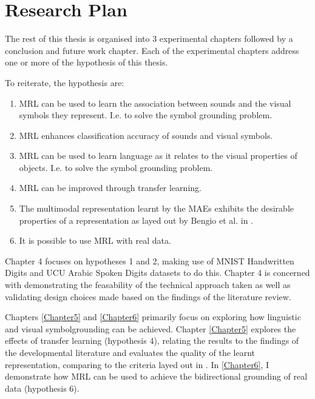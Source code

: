 \section{Research Plan}
The rest of this thesis is organised into 3 experimental chapters followed by a conclusion and future work chapter.
Each of the experimental chapters address one or more of the hypothesis of this thesis.

To reiterate, the hypothesis are:

\begin{enumerate}

	\item \ac{MRL} can be used to learn the association between sounds and the visual symbols they represent. I.e. to solve the symbol grounding problem.
	\item \ac{MRL} enhances classification accuracy of sounds and visual symbols.
	\item \ac{MRL} can be used to learn language as it relates to the visual properties of objects. I.e. to solve the symbol grounding problem.
	\item \ac{MRL} can be improved through transfer learning.
	\item The multimodal representation learnt by the \acp{MAE} exhibits the desirable properties of a representation as layed out by Bengio et al. in \cite{repRev}.		
	\item It is possible to use \ac{MRL} with real data.
	
\end{enumerate}

Chapter 4 focuses on hypotheses 1 and 2, making use of MNIST Handwritten Digits and UCU Arabic Spoken Digits datasets to do this. Chapter 4 is concerned with demonstrating the feasability of the technical approach taken as well as validating design choices made based on the findings of the literature review. 

Chapters \ref{Chapter5} and \ref{Chapter6} primarily focus on exploring how linguistic and visual symbolgrounding can be achieved. Chapter \ref{Chapter5} explores the effects of transfer learning (hypothesis 4), relating the results to the findings of the developmental literature and evaluates the quality of the learnt representation, comparing to the criteria layed out in \cite{repRev}. In \autoref{Chapter6}, I demonstrate how \ac{MRL} can be used to achieve the bidirectional grounding of real data (hypothesis 6). 
